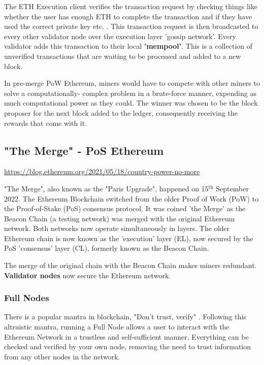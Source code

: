 The ETH Execution client verifies the transaction request by checking things like whether the user has enough ETH to complete the transaction and if they have used the correct private key etc. \cite{EthereumEthereum.org}. 
This transaction request is then broadcasted to every other validator node over the execution layer 'gossip network'. Every validator adds this transaction to their local \textbf{'mempool'}. This is a collection of unverified transactions that are waiting to be processed and added to a new block.

In pre-merge PoW Ethereum, miners would have to compete with other miners to solve a computationally- complex problem in a brute-force manner, expending as much computational power as they could. The winner was chosen to be the block proposer for the next block added to the ledger, consequently receiving the rewards that come with it.

\subsection{"The Merge" - PoS Ethereum}

\url{https://blog.ethereum.org/2021/05/18/country-power-no-more}

"The Merge", also known as the "Paris Upgrade", happened on 15$\mathrm{^{th}}$ September 2022. The Ethereum Blockchain switched from the older Proof of Work (PoW) to the Proof-of-Stake (PoS) consensus protocol. It was coined 'the Merge' as the Beacon Chain (a testing network) was merged with the original Ethereum network. Both networks now operate simultaneously in layers. The older Ethereum chain is now known as the 'execution' layer (EL), now secured by the PoS 'consensus' layer (CL), formerly known as the Beacon Chain. 

The merge of the original chain with the Beacon Chain makes miners redundant. \textbf{Validator nodes} now secure the Ethereum network. 

\subsubsection{Full Nodes}
There is a popular mantra in blockchain, "Don't trust, verify" \cite{EthereumEthereum.org}. Following this altruistic mantra, running a Full Node allows a user to interact with the Ethereum Network in a trustless and self-sufficient manner. Everything can be checked and verified by your own node, removing the need to trust information from any other nodes in the network. 

